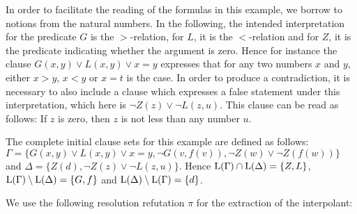 \begin{exa}
	\label{exa:two_phase}
	In order to facilitate the reading of the formulas in this example, we borrow to notions from the natural numbers.
	In the following, 
	the intended interpretation for the predicate $G$ is the $>$-relation, for $L$, it is the $<$-relation and for $Z$, it is the predicate indicating whether the argument is zero.
	Hence for instance the clause $G(x, y) \lor L(x, y) \lor x = y$ expresses that for any two numbers $x$ and $y$, either $x>y$, $x<y$ or $x=t$ is the case.
	In order to produce a contradiction, it is necessary to also include a clause which expresses a false statement under this interpretation, which here is $\lnot Z(z) \lor \lnot L(z, u)$. 
	This clause can be read as follows: If $z$ is zero, then $z$ is not less than any number $u$.

	The complete initial clause sets for this example are defined as follows:
	$\Gamma = \{ G(x, y) \lor L(x, y) \lor x = y, \lnot G(v, f(v)), \lnot Z(w) \lor \lnot Z(f(w)) \}$
	and 
	$\Delta = \{ Z(d), \lnot Z(z) \lor \lnot L(z, u) \}$.
	Hence $\operatorname{L}(\Gamma)\cap \operatorname{L}(\Delta) = \{ Z, L \}$,
	$\operatorname{L}(\Gamma)\setminus \operatorname{L}(\Delta) = \{ G,  f \}$ and
	$\operatorname{L}(\Delta)\setminus \operatorname{L}(\Gamma) = \{ d \}$.

	We use the following resolution refutation $\pi$ for the extraction of the interpolant:
	\smallskip
	{ %

		
		\begin{adjustwidth}{6.2em}{0em}
			\def\defaultHypSeparation{\hskip 1.4em}
			\def\ScoreOverhang{-0em}
			\begin{prooftree}



				\RightLabelm{\resrule{\resrulefac}{\id}}


				\insertBetweenHyps{\hskip -9em}



\end{prooftree}
\end{adjustwidth}}
\end{exa}
